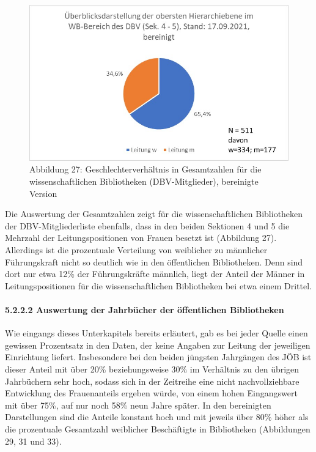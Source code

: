 \documentclass[a4paper,
fontsize=11pt,
oneside,
numbers=noperiodatend,
parskip=half-,
bibliography=totoc,
final
]{scrartcl}
\begin{document}
\begin{figure}
\centering
\includegraphics{img/Abb_27_DBV-Sek4-5_gesamt_bereinigt.jpg}
\caption{Abbildung 27: Geschlechterverhältnis in Gesamtzahlen für die
wissenschaftlichen Bibliotheken (DBV-Mitglieder), bereinigte Version}
\end{figure}

Die Auswertung der Gesamtzahlen zeigt für die wissenschaftlichen
Bibliotheken der DBV-Mit\-glied\-er\-liste ebenfalls, dass in den beiden
Sektionen 4 und 5 die Mehrzahl der Leitungspositionen von Frauen besetzt
ist (Abbildung 27). Allerdings ist die prozentuale Verteilung von
weiblicher zu männlicher Führungskraft nicht so deutlich wie in den
öffentlichen Bibliotheken. Denn sind dort nur etwa 12\% der
Führungskräfte männlich, liegt der Anteil der Männer in
Leitungspositionen für die wissenschaftlichen Bibliotheken bei etwa
einem Drittel.

\paragraph{5.2.2.2 Auswertung der Jahrbücher der öffentlichen Bibliotheken}

Wie eingangs dieses Unterkapitels bereits erläutert, gab es bei jeder
Quelle einen gewissen Prozentsatz in den Daten, der keine Angaben zur
Leitung der jeweiligen Einrichtung liefert. Insbesondere bei den beiden
jüngsten Jahrgängen des JÖB ist dieser Anteil mit über 20\%
beziehungsweise 30\% im Verhältnis zu den übrigen Jahrbüchern sehr hoch,
sodass sich in der Zeitreihe eine nicht nachvollziehbare Entwicklung des
Frauenanteils ergeben würde, von einem hohen Eingangswert mit über 75\%,
auf nur noch 58\% neun Jahre später. In den bereinigten Darstellungen
sind die Anteile konstant hoch und mit jeweils über 80\% höher als die
prozentuale Gesamtzahl weiblicher Beschäftigte in Bibliotheken
(Abbildungen 29, 31 und 33).
\end{document}
